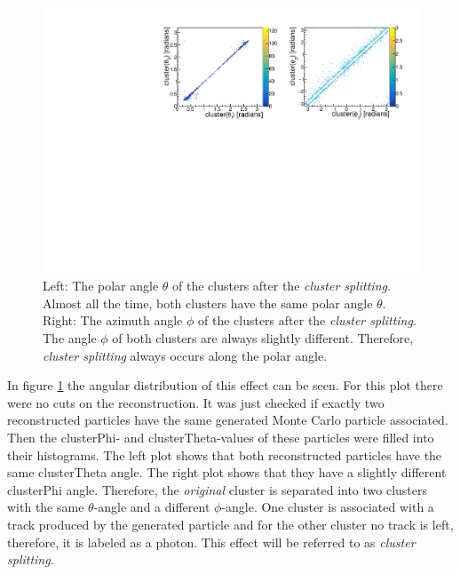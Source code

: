 \documentclass[a4paper,11pt,twosided,final,german,openbib,pdftex,listof=totoc,bibliography=totoc]{scrbook}
\begin{document}
\begin{figure}[h!]
	\centering
	\includegraphics[width=\textwidth]{AnhangPlots/ttpp.pdf}
	\caption[Cluster Splitting Angle Distribution]{Left: The polar angle $\theta$ of the clusters after the \textit{cluster splitting}. Almost all the time, both clusters have the same polar angle $\theta$.  Right: The azimuth angle $\phi$ of the clusters after the \textit{cluster splitting}. The angle $\phi$ of both clusters are always slightly different. Therefore, \textit{cluster splitting} always occurs along the polar angle.}
	\label{fig:clusterSplittingAngle}
\end{figure}








In figure \ref{fig:clusterSplittingAngle} the angular distribution of this effect can be seen. For this plot there were no cuts on the reconstruction. It was just checked if exactly two reconstructed particles have the same generated Monte Carlo particle associated. Then the clusterPhi- and clusterTheta-values of these particles were filled into their histograms. The left plot shows that both reconstructed particles have the same clusterTheta angle. The right plot shows that they have a slightly different clusterPhi angle. Therefore, the \textit{original} cluster  is separated into two clusters with the same $\theta$-angle and a different $\phi$-angle. One cluster is associated with a track produced by the generated particle and for the other cluster no track is left, therefore, it is labeled as a photon. This effect will be referred to as \textit{cluster splitting}.
\end{document}
